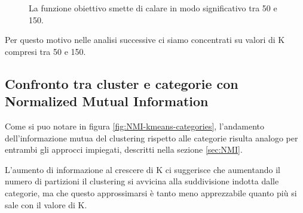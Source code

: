 \documentclass[
	11pt, %
	a4paper, %
	oneside, %
	headinclude,footinclude, %
	BCOR5mm, %
]{scrartcl}
\begin{document}
\begin{figure}[!htb]
\begin{subfigure}{.5\textwidth}
			\end{subfigure}
			\caption{La funzione obiettivo smette di calare in modo significativo tra 50 e 150.}
			\label{fig:KMeansObj}
		\end{figure}

	Per questo motivo nelle analisi successive ci siamo concentrati su valori di K compresi tra 50 e 150.

	\subsection{Confronto tra cluster e categorie con Normalized Mutual Information} \label{sec:NMI-confronto}
		Come si puo notare in figura \ref{fig:NMI-kmeans-categories}, l'andamento dell'informazione mutua del clustering rispetto alle categorie risulta analogo per entrambi gli approcci impiegati, descritti nella sezione \ref{sec:NMI}.

		L'aumento di informazione al crescere di K ci suggerisce che aumentando il numero di partizioni il clustering si avvicina alla suddivisione indotta dalle categorie, ma che questo approssimarsi è tanto meno apprezzabile quanto più si sale con il valore di K.
\end{document}
